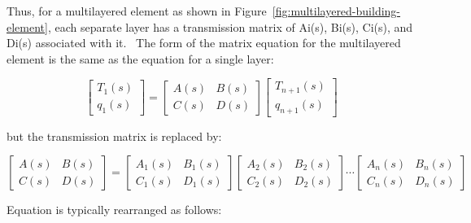 Thus, for a multilayered element as shown in Figure~\ref{fig:multilayered-building-element}, each separate layer has a transmission matrix of Ai(s), Bi(s), Ci(s), and Di(s) associated with it.~ The form of the matrix equation for the multilayered element is the same as the equation for a single layer:

\begin{equation}
\left[ {\begin{array}{*{20}{c}}{{T_1}\left( s \right)}\\ {{q_1}\left( s \right)}\end{array}} \right] = \left[ {\begin{array}{*{20}{c}}{A\left( s \right)}&{B\left( s \right)}\\ {C\left( s \right)}&{D\left( s \right)}\end{array}} \right]\left[ {\begin{array}{*{20}{c}}{{T_{n + 1}}\left( s \right)}\\ {{q_{n + 1}}\left( s \right)}\end{array}} \right]
\end{equation}

but the transmission matrix is replaced by:

\begin{equation}
\left[ {\begin{array}{*{20}{c}}{A\left( s \right)}&{B\left( s \right)}\\ {C\left( s \right)}&{D\left( s \right)}\end{array}} \right] = \left[ {\begin{array}{*{20}{c}}{{A_1}\left( s \right)}&{{B_1}\left( s \right)}\\ {{C_1}\left( s \right)}&{{D_1}\left( s \right)}\end{array}} \right]\left[ {\begin{array}{*{20}{c}}{{A_2}\left( s \right)}&{{B_2}\left( s \right)}\\ {{C_2}\left( s \right)}&{{D_2}\left( s \right)}\end{array}} \right] \cdots \left[ {\begin{array}{*{20}{c}}{{A_n}\left( s \right)}&{{B_n}\left( s \right)}\\ {{C_n}\left( s \right)}&{{D_n}\left( s \right)}\end{array}} \right]
\end{equation}

Equation is typically rearranged as follows:

